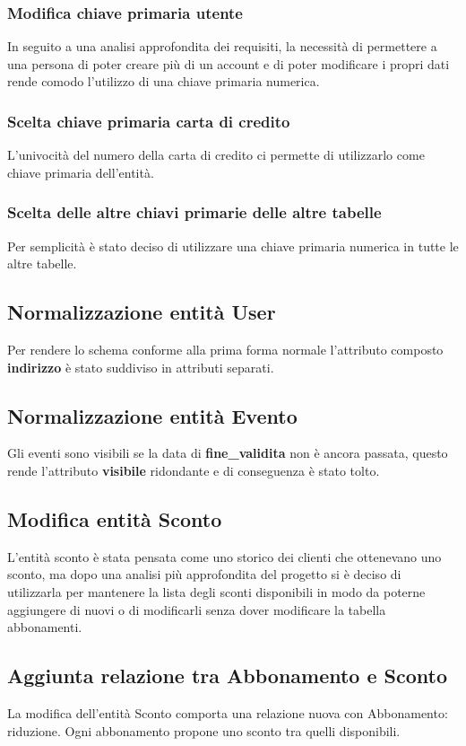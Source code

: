 \subsubsection{Modifica chiave primaria utente}
In seguito a una analisi approfondita dei requisiti, la necessità di permettere a una persona di poter creare più di un account e di poter modificare i propri dati rende comodo l'utilizzo di una chiave primaria numerica.  

\subsubsection{Scelta chiave primaria carta di credito}
L'univocità del numero della carta di credito ci permette di utilizzarlo come chiave primaria dell'entità.

\subsubsection{Scelta delle altre chiavi primarie delle altre tabelle}
Per semplicità è stato deciso di utilizzare una chiave primaria numerica in tutte le altre tabelle.

\subsection{Normalizzazione entità User} 
Per rendere lo schema conforme alla prima forma normale l'attributo composto \textbf{indirizzo} è stato suddiviso in attributi separati.

\subsection{Normalizzazione entità Evento}
Gli eventi sono visibili se la data di
\textbf{fine{\_}validita} non è ancora passata,
questo rende l'attributo 
\textbf{visibile} ridondante 
e di conseguenza è stato tolto.

\subsection{Modifica entità Sconto}
L'entità sconto è stata pensata come uno storico dei clienti che ottenevano uno sconto, ma dopo una analisi più approfondita del progetto si è deciso di utilizzarla per mantenere la lista degli sconti disponibili in modo da poterne aggiungere di nuovi o di modificarli senza dover modificare la tabella abbonamenti.  

\subsection{Aggiunta relazione tra Abbonamento e Sconto}
La modifica dell'entità Sconto comporta una relazione nuova con Abbonamento: riduzione. Ogni abbonamento propone uno sconto tra quelli disponibili.

